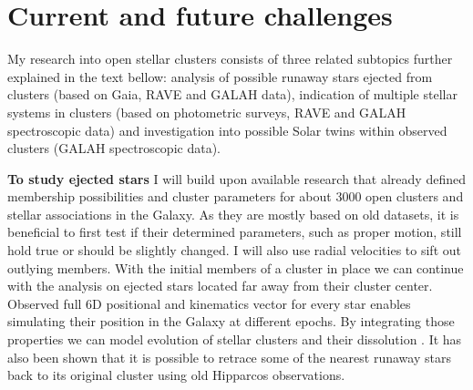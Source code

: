 \section{Current and future challenges}

My research into open stellar clusters consists of three related subtopics further explained in the text bellow: analysis of possible runaway stars ejected from clusters (based on Gaia, RAVE and GALAH data), indication of multiple stellar systems in clusters (based on photometric surveys, RAVE and GALAH spectroscopic data) and investigation into possible Solar twins within observed clusters (GALAH spectroscopic data).

\textbf{To study ejected stars} I will build upon available research that already defined membership possibilities and cluster parameters for about 3000 open clusters and stellar associations \cite{2013A&A...558A..53K} in the Galaxy. As they are mostly based on old datasets, it is beneficial to first test if their determined parameters, such as proper motion, still hold true or should be slightly changed. I will also use radial velocities to sift out outlying members. With the initial members of a cluster in place we can continue with the analysis on ejected stars located far away from their cluster center. Observed full 6D positional and kinematics vector for every star enables simulating their position in the Galaxy at different epochs. By integrating those properties we can model evolution of stellar clusters and their dissolution \cite{1998A&A...337..363P}. It has also been shown \cite{2000ApJ...544L.133H} that it is possible to retrace some of the nearest runaway stars back to its original cluster using old Hipparcos observations.

